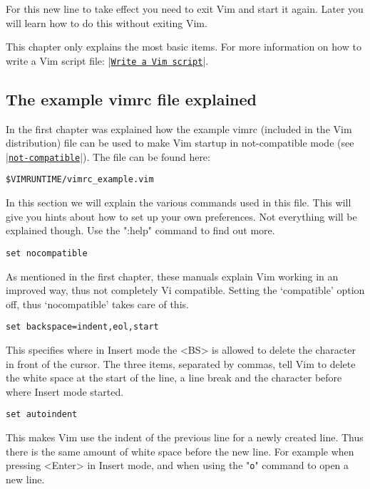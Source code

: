 For this new line to take effect you need to exit Vim and start it again.
Later you will learn how to do this without exiting Vim.

This chapter only explains the most basic items.
For more information on how to write a Vim script file: |\hyperref[Write a Vim script]{\texttt{Write a Vim script}}|.

\subsection{The example vimrc file explained}
\label{vimrc_example.vim}

In the first chapter was explained how the example vimrc (included in the Vim distribution) file can be used to make Vim startup in not-compatible mode (see \hyperref[not-compatible]{|\texttt{not-compatible}|}).
The file can be found here:

\begin{Verbatim}[samepage=true]
    $VIMRUNTIME/vimrc_example.vim 
\end{Verbatim}

In this section we will explain the various commands used in this file.
This will give you hints about how to set up your own preferences.
Not everything will be explained though.
Use the ":help" command to find out more.

 \begin{Verbatim}[samepage=true]
 set nocompatible
 \end{Verbatim}

As mentioned in the first chapter, these manuals explain Vim working in an improved way, thus not completely Vi compatible.
Setting the `compatible' option off, thus `nocompatible' takes care of this.

 \begin{Verbatim}[samepage=true]
 set backspace=indent,eol,start
 \end{Verbatim}

This specifies where in Insert mode the <BS> is allowed to delete the character in front of the cursor.
The three items, separated by commas, tell Vim to delete the white space at the start of the line, a line break and the character before where Insert mode started.

 \begin{Verbatim}[samepage=true]
 set autoindent
 \end{Verbatim}

This makes Vim use the indent of the previous line for a newly created line.
Thus there is the same amount of white space before the new line.
For example when pressing <Enter> in Insert mode, and when using the "\verb!o!" command to open a new line.


